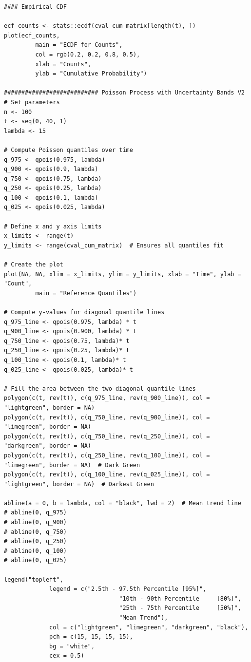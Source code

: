 \begin{knitrout}
\begin{kframe}
\begin{verbatim}
#### Empirical CDF

ecf_counts <- stats::ecdf(cval_cum_matrix[length(t), ])
plot(ecf_counts,
		 main = "ECDF for Counts",
		 col = rgb(0.2, 0.2, 0.8, 0.5),
		 xlab = "Counts",
		 ylab = "Cumulative Probability")

########################### Poisson Process with Uncertainty Bands V2
# Set parameters
n <- 100
t <- seq(0, 40, 1)
lambda <- 15

# Compute Poisson quantiles over time
q_975 <- qpois(0.975, lambda)
q_900 <- qpois(0.9, lambda)
q_750 <- qpois(0.75, lambda)
q_250 <- qpois(0.25, lambda)
q_100 <- qpois(0.1, lambda)
q_025 <- qpois(0.025, lambda)

# Define x and y axis limits
x_limits <- range(t)
y_limits <- range(cval_cum_matrix)  # Ensures all quantiles fit

# Create the plot
plot(NA, NA, xlim = x_limits, ylim = y_limits, xlab = "Time", ylab = "Count",
		 main = "Reference Quantiles")

# Compute y-values for diagonal quantile lines
q_975_line <- qpois(0.975, lambda) * t
q_900_line <- qpois(0.900, lambda) * t
q_750_line <- qpois(0.75, lambda)* t
q_250_line <- qpois(0.25, lambda)* t
q_100_line <- qpois(0.1, lambda)* t
q_025_line <- qpois(0.025, lambda)* t

# Fill the area between the two diagonal quantile lines
polygon(c(t, rev(t)), c(q_975_line, rev(q_900_line)), col = "lightgreen", border = NA)
polygon(c(t, rev(t)), c(q_750_line, rev(q_900_line)), col = "limegreen", border = NA)
polygon(c(t, rev(t)), c(q_750_line, rev(q_250_line)), col = "darkgreen", border = NA)
polygon(c(t, rev(t)), c(q_250_line, rev(q_100_line)), col = "limegreen", border = NA)  # Dark Green
polygon(c(t, rev(t)), c(q_100_line, rev(q_025_line)), col = "lightgreen", border = NA)  # Darkest Green

abline(a = 0, b = lambda, col = "black", lwd = 2)  # Mean trend line
# abline(0, q_975)   
# abline(0, q_900)   
# abline(0, q_750)   
# abline(0, q_250)   
# abline(0, q_100)   
# abline(0, q_025)  

legend("topleft",
			 legend = c("2.5th - 97.5th Percentile [95%]", 
			 					 "10th - 90th Percentile     [80%]", 
			 					 "25th - 75th Percentile     [50%]", 
			 					 "Mean Trend"),
			 col = c("lightgreen", "limegreen", "darkgreen", "black"),
			 pch = c(15, 15, 15, 15),
			 bg = "white",
			 cex = 0.5) 
\end{verbatim}
\end{kframe}


\end{knitrout}
